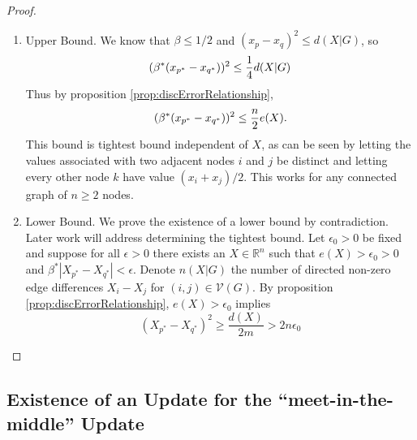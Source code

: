 \documentclass{article}
\theoremstyle{remark}
\newcommand{\R}[0]{\mathbb{R}}
\begin{document}
\begin{proof}
	\begin{enumerate}
		\item Upper Bound. We know that $\beta\leq1/2$ and $(x_p-x_q)^2 \leq d(X|G)$, so
			\begin{equation}{\label{eq:updateSizeBound1}}
				(\beta^*(x_{p^*}-x_{q^*}))^2\leq \frac{1}{4}d(X|G) 
			\end{equation}
			Thus by proposition \ref{prop:discErrorRelationship},
			\begin{equation}{\label{eq:updateSizeBound2}}
				(\beta^*(x_{p^*}-x_{q^*}))^2 \leq \frac{n}{2}e(X).
			\end{equation}
			This bound is tightest bound independent of $X$, as can be seen by letting the values associated with two adjacent nodes $i$ and $j$ be distinct and letting every other node $k$ have value $(x_i+x_j)/2$. This works for any connected graph of $n\geq2$ nodes.
		\item Lower Bound. We prove the existence of a lower bound by contradiction. Later work will address determining the tightest bound.
			Let $\epsilon_0>0$ be fixed and suppose for all $\epsilon>0$ there exists an $X\in\R^n$ such that $e(X)>\epsilon_0>0$ and $\beta^*|X_{p^*}-X_{q^*}|<\epsilon$. Denote $n(X|G)$ the number of directed non-zero edge differences $X_i-X_j$ for $(i,j)\in\mathcal{V}(G)$. By proposition \ref{prop:discErrorRelationship}, $e(X)>\epsilon_0$ implies
			\begin{equation}
				(X_{p^*}-X_{q^*})^2 \geq \frac{d(X)}{2m} > 2n\epsilon_0
			\end{equation}
	\end{enumerate}
\end{proof}


\subsection{Existence of an Update for the ``meet-in-the-middle'' Update}
\end{document}
